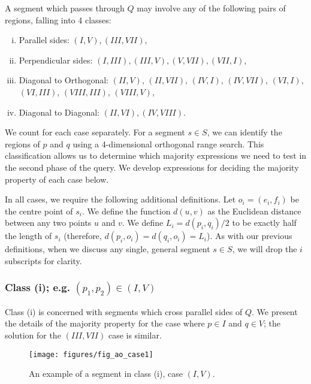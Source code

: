 A segment which passes through $Q$ may involve any of the following pairs of regions, falling into 4 classes:

\begin{enumerate}[i.]
\item Parallel sides: $(I, V), (III, VII)$,
\item Perpendicular sides: $(I, III), (III, V), (V,VII), (VII, I)$,
\item Diagonal to Orthogonal: $(II, V)$, $(II, VII)$, $(IV, I)$, $(IV,VII)$, $(VI, I)$, $(VI, III)$, $(VIII, III)$, $(VIII, V)$,
\item Diagonal to Diagonal: $(II, VI), (IV, VIII)$.
\end{enumerate}

We count for each case separately. For a segment $s \in S$, we can identify the regions of $p$ and $q$ using a 4-dimensional orthogonal range search. This classification allows us to determine which majority expressions we need to test in the second phase of the query. We develop expressions for deciding the majority property of each case below.

In all cases, we require the following additional definitions. Let $o_i = (e_i, f_i)$ be the centre point of $s_i$.  We define the function $d(u,v)$ as the Euclidean distance between any two points $u$ and $v$. We define $L_i = d(p_i, q_i)/2$ to be exactly half the length of $s_i$ (therefore, $d(p_i, o_i) = d(q_i, o_i) = L_i$). As with our previous definitions, when we discuss any single, general segment $s \in S$, we will drop the $i$ subscripts for clarity.


\subsubsection*{Class (i); e.g. $(p_1, p_2) \in (I, V)$}
\label{:rectangles:ao:class1}

Class (i) is concerned with segments which cross parallel sides of $Q$. We present the details of the majority property for the case where $p \in I$ and $q \in V$; the solution for the $(III, VII)$ case is similar.

\begin{figure}[t]
\begin{center}
  \texttt{[image: figures/fig\_ao\_case1]}
  \caption{An example of a segment in class (i), case $(I, V)$.}
  \label{fig:rectangles:ao:case1}
\end{center}
\end{figure}

